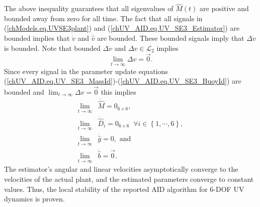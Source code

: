 %
The above inequality guarantees that all eigenvalues of $\hat{M}(t)$
are positive and bounded away from zero for all time. 
%
The fact that all signals in (\ref{chModels.eq.UVSE3plant}) and
(\ref{chUV_AID.eq.UV_SE3_Estimator}) are bounded implies that $\dot{v}$
and $\dot{\hat{v}}$ are bounded.  
%
These bounded signals imply that $\Delta \dot{v}$ is bounded.  
%
Note that bounded $\Delta \dot{v}$ and $\Delta v \in \mathcal{L}_2$
implies%
%
\begin{equation}
\lim_{t\to \infty}\Delta v=\vec{0}.
\end{equation}
%
Since every signal in the parameter update equations
(\ref{chUV_AID.eq.UV_SE3_MassId})-(\ref{chUV_AID.eq.UV_SE3_BuoyId})
are bounded and $\lim_{t\to \infty}\Delta v=\vec{0}$ this implies
%
\begin{align}
\lim_{t\to \infty}&\dot{\hat{M}}=0_{6 \times 6},
\nonumber \\
\lim_{t\to \infty}&\dot{\hat{D}}_i=0_{6 \times 6}\; \; \forall i\in\left\{1,\cdots,6\right\},
\nonumber \\
\lim_{t\to \infty}&\dot{\hat{g}}=0,\text{ and}
\nonumber \\
\lim_{t\to \infty}&\dot{\hat{b}}=\vec{0}.
\end{align}
The estimator's angular and linear velocities
asymptotically converge to the velocities of the actual plant, and
the estimated parameters converge to constant values.
%
Thus, the local stability of the reported \ac{AID} algorithm for
6-\ac{DOF} \ac{UV} dynamics is proven.
